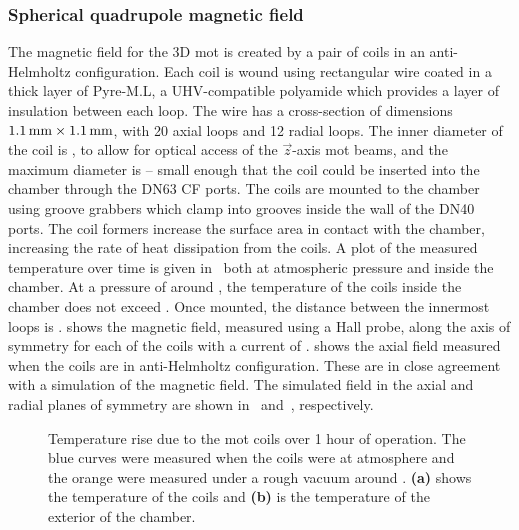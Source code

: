 \subsubsection{Spherical quadrupole magnetic field}
The magnetic field for the 3D \ac{mot} is created by a pair of coils in an
anti-Helmholtz configuration. Each coil is wound using rectangular wire coated in a
 thick layer of Pyre-M.L, a UHV-compatible polyamide
which provides a layer of insulation between each loop. The wire has a
cross-section of dimensions \(\sivalue{1.1}{\milli\metre} \times
\sivalue{1.1}{\milli\metre}\), with 20 axial loops and 12 radial loops. The
inner diameter of the coil is , to allow for optical
access of the \(\vec{z}\)-axis \ac{mot} beams, and the maximum diameter is
 -- small enough that the coil could be
inserted into the chamber through the DN63 CF ports. The coils are mounted to
the chamber using groove grabbers which clamp into grooves inside the wall of
the DN40 ports. The coil formers increase the surface area in contact with the chamber, increasing the rate of heat dissipation from the coils. A plot of the measured temperature over time is given in~ both at atmospheric pressure and inside the chamber. At a pressure of around  , the temperature of the coils inside the chamber does not exceed . Once mounted, the distance between the innermost
loops is .  shows the
magnetic field, measured using a Hall probe, along the axis of symmetry for each
of the coils with a current of .  shows the axial field measured when the coils are in anti-Helmholtz configuration. These are in close
agreement with a simulation of the magnetic field. The simulated field in the axial and radial planes of symmetry are shown
in~ and~, respectively.
\begin{figure}[!htbp]
	\centering
	\def\svgwidth{\columnwidth}
	\label{fig:mot_coil_temp}
	\label{fig:mot_coil_temp_tg4}
	\caption[\ac{mot} coil temperature rise]{Temperature rise due to the \ac{mot} coils over 1 hour of operation. The blue curves were measured when the coils were at atmosphere and the orange were measured under a rough vacuum around . \textbf{(a)} shows the temperature of the coils and \textbf{(b)} is the temperature of the exterior of the chamber.}
	\label{fig:mot_coil_temp_both}
\end{figure}
